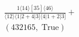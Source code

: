 \documentclass[varwidth, border=5pt]{standalone}
\begin{document}
\begin{my}
$\begin{gathered}
\scriptscriptstyle\frac{1⟨14⟩[35]⟨46⟩}{⟨12⟩⟨1|2+4|3]⟨4|1+2|3]}+\\
\scriptscriptstyle(432165,\;\text{True})\phantom{+}
\end{gathered}$
\end{my}
\end{document}
